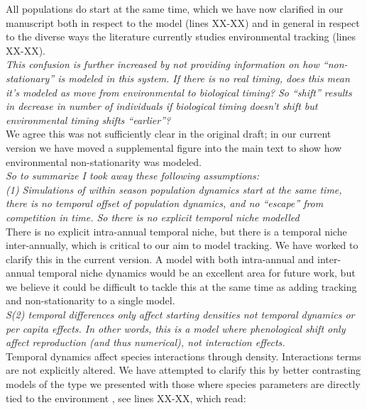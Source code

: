 \documentclass[11pt]{article}
\begin{document}
All populations do start at the same time, which we have now clarified in our manuscript both in respect to the model (lines XX-XX) and in general in respect to the diverse ways the literature currently studies environmental tracking (lines XX-XX).\\ 

\emph{This confusion is further increased by not providing information on how ``non-stationary'' is
modeled in this system. If there is no real timing, does this mean it’s modeled as move from
environmental to biological timing? So ``shift'' results in decrease in number of individuals
if biological timing doesn’t shift but environmental timing shifts “earlier”?}\\

We agree this was not sufficiently clear in the original draft; in our current version we have moved a supplemental figure into the main text to show how environmental non-stationarity was modeled. \\

\emph{So to summarize I took away these following assumptions:\\
(1)     Simulations of within season population dynamics start at the same time, there is no
temporal offset of population dynamics, and no ``escape'' from competition in time. So there is
no explicit temporal niche modelled}\\

There is no explicit intra-annual temporal niche, but there is a temporal niche inter-annually, which is critical to our aim to model tracking. We have worked to clarify this in the current version. A model with both intra-annual and inter-annual temporal niche dynamics would be an excellent area for future work, but we believe it could be difficult to tackle this at the same time as adding tracking and non-stationarity to a single model. \\

\emph{S(2)     temporal differences only affect starting densities not temporal dynamics or per
capita effects. In other words, this is a model where phenological shift only affect
reproduction (and thus numerical), not interaction effects.}\\

Temporal dynamics affect species interactions through density. Interactions terms are not explicitly altered. We have attempted to clarify this by better contrasting models of the type we presented with those where species parameters are directly tied to the environment \citet{volkerass}, see lines XX-XX, which read:
\begin{quote}
\end{quote}
\end{document}
